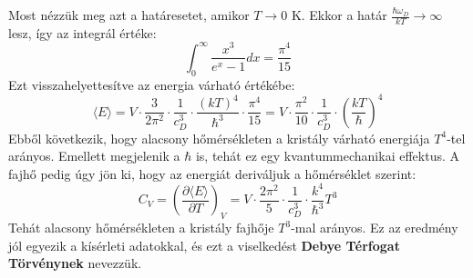 \documentclass[../main.tex]{subfiles}
\begin{document}
Most nézzük meg azt a határesetet, amikor $T \to 0$ K. Ekkor a határ $\frac{\hbar \omega_D}{k T} \to \infty$ lesz, így az integrál értéke:
\begin{equation}
    \int_0^{\infty} \frac{x^3}{e^x - 1} dx = \frac{\pi^4}{15}
\end{equation}
Ezt visszahelyettesítve az energia várható értékébe:
\begin{equation}
    \langle E \rangle = V \cdot \frac{3}{2 \pi^2} \cdot \frac{1}{c_D^3} \cdot \frac{(k T)^4}{\hbar^3} \cdot \frac{\pi^4}{15} = V \cdot \frac{\pi^2}{10} \cdot \frac{1}{c_D^3} \cdot \left(\frac{k T}{\hbar}\right)^4
\end{equation}
Ebből következik, hogy alacsony hőmérsékleten a kristály várható energiája $T^4$-tel arányos. Emellett megjelenik a $\hbar$ is, tehát ez egy kvantummechanikai effektus.
A fajhő pedig úgy jön ki, hogy az energiát deriváljuk a hőmérséklet szerint:
\begin{equation}
    C_V = \left(\frac{\partial \langle E \rangle}{\partial T}\right)_V = V \cdot \frac{2 \pi^2}{5} \cdot \frac{1}{c_D^3} \cdot \frac{k^4}{\hbar^3} T^3
\end{equation}
Tehát alacsony hőmérsékleten a kristály fajhője $T^3$-mal arányos. Ez az eredmény jól egyezik a kísérleti adatokkal, és ezt a viselkedést \textbf{Debye Térfogat Törvénynek} nevezzük.
\end{document}
